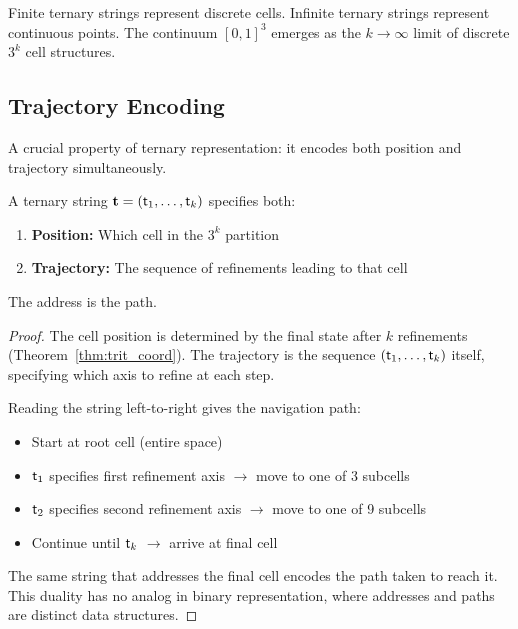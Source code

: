 \begin{corollary}
\label{cor:discrete_continuous}
Finite ternary strings represent discrete cells. Infinite ternary strings represent continuous points. The continuum $[0,1]^3$ emerges as the $k \to \infty$ limit of discrete $3^k$ cell structures.
\end{corollary}

\subsection{Trajectory Encoding}

A crucial property of ternary representation: it encodes both position and trajectory simultaneously.

\begin{theorem}
\label{thm:trajectory}
A ternary string $\mathbf{t} = (\mathsf{t}_1, \ldots, \mathsf{t}_k)$ specifies both:
\begin{enumerate}
\item \textbf{Position:} Which cell in the $3^k$ partition
\item \textbf{Trajectory:} The sequence of refinements leading to that cell
\end{enumerate}
The address is the path.
\end{theorem}

\begin{proof}
The cell position is determined by the final state after $k$ refinements (Theorem~\ref{thm:trit_coord}). The trajectory is the sequence $(\mathsf{t}_1, \ldots, \mathsf{t}_k)$ itself, specifying which axis to refine at each step.

Reading the string left-to-right gives the navigation path:
\begin{itemize}
\item Start at root cell (entire space)
\item $\mathsf{t}_1$ specifies first refinement axis $\to$ move to one of 3 subcells
\item $\mathsf{t}_2$ specifies second refinement axis $\to$ move to one of 9 subcells
\item Continue until $\mathsf{t}_k$ $\to$ arrive at final cell
\end{itemize}

The same string that addresses the final cell encodes the path taken to reach it. This duality has no analog in binary representation, where addresses and paths are distinct data structures.
\end{proof}

